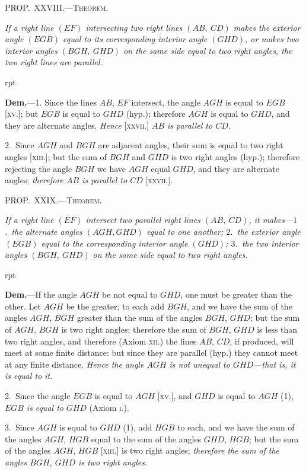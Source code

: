 \documentclass[oneside]{book}
\newcommand\mypropl[2]{
\bigskip\Needspace*{4\baselineskip}\begin{center}\textsc{#1}\end{center}
\hspace{\parindent}\emph{#2}\par\medskip
}
\newcommand\imgflow[3]{
\setcounter{wrapwidth}{#1}
\begin{wrapfigure}[#2]{r}{\value{wrapwidth}pt}
\begin{center}
\vspace{-0.3in}
\end{center}
\end{wrapfigure}
}
\begin{document}
\mypropl{PROP\@.~XXVIII\@.---Theorem.}{If a right line $(EF)$ intersecting two right lines $(AB,\ CD)$
makes the exterior angle $(EGB)$ equal to its corresponding
interior angle $(GHD)$, or makes two interior
angles $(BGH,\ GHD)$ on the same side equal to two right
angles, the two right lines are parallel.}

\imgflow{133}{8}{f048}

\textbf{Dem.}---1. Since the lines $AB$, $EF$ intersect, the
angle $AGH$ is equal to $EGB$
[\textsc{xv}.]; but $EGB$ is equal to
$GHD$ (hyp.); therefore $AGH$
is equal to $GHD$, and they
are alternate angles. \textit{Hence}
[\textsc{xxvii}.] \textit{$AB$ is parallel to
$CD$.}

2.~Since $AGH$ and $BGH$
are adjacent angles, their sum is equal to two right
angles [\textsc{xiii}.]; but the sum of $BGH$ and $GHD$ is two
right angles (hyp.); therefore rejecting the angle $BGH$
we have $AGH$ equal $GHD$, and they are alternate
angles; \textit{therefore $AB$ is parallel to $CD$} [\textsc{xxvii}.].



\mypropl{PROP\@.~XXIX\@.---Theorem.}{If a right line $(EF)$ intersect two parallel right lines
$(AB,\ CD)$, it makes---$1$.~the alternate angles $(AGH, GHD)$
equal to one another; $2$.~the exterior angle $(EGB)$ equal
to the corresponding interior angle $(GHD)$; $3$.~the two
interior angles $(BGH,\ GHD)$ on the same side equal to
two right angles.}

\imgflow{135}{8}{f049}

\textbf{Dem.}---If the angle $AGH$ be not equal to $GHD$, one
must be greater than the
other. Let $AGH$ be the
greater; to each add $BGH$,
and we have the sum of the
angles $AGH$, $BGH$ greater
than the sum of the angles
$BGH$, $GHD$; but the sum of
$AGH$, $BGH$ is two right
angles; therefore the sum of $BGH$, $GHD$ is less than
two right angles, and therefore (Axiom \textsc{xii.}) the lines
$AB$, $CD$, if produced, will meet at some finite distance:
but since they are parallel (hyp.) they cannot meet at
any finite distance. \textit{Hence the angle $AGH$ is not unequal
to $GHD$---that is, it is equal to it.}

2.~Since the angle $EGB$ is equal to $AGH$ [\textsc{xv.}], and
$GHD$ is equal to $AGH$ (1), $EGB$ \emph{is equal to} $GHD$
(Axiom \textsc{i}.).

3.~Since $AGH$ is equal to $GHD$ (1), add $HGB$ to each,
and we have the sum of the angles $AGH$, $HGB$ equal
to the sum of the angles $GHD$, $HGB$; but the sum of the
angles $AGH$, $HGB$ [\textsc{xiii.}] is two right angles; \textit{therefore
the sum of the angles $BGH$, $GHD$ is two right angles.}
\end{document}
